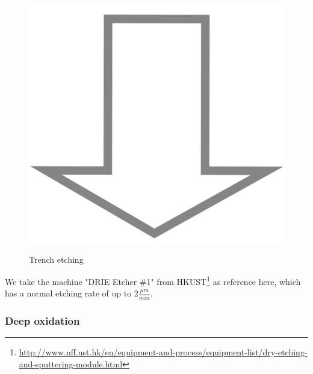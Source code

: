 \begin{figure}[H]
	\centering
	\begin{tikzpicture}[node distance = 3cm, auto, thick,scale=\CrossSectionOnly, every node/.style={transform shape}]
		
	\end{tikzpicture} \\
	\includegraphics[scale=0.01]{down_arrow.png} \\
	\begin{tikzpicture}[node distance = 3cm, auto, thick,scale=\CrossSectionOnly, every node/.style={transform shape}]
		
	\end{tikzpicture}
	\caption{Trench etching}
\end{figure}

We take the machine "DRIE Etcher \#1" from HKUST\footnote{\url{http://www.nff.ust.hk/en/equipment-and-process/equipment-list/dry-etching-and-sputtering-module.html}} as reference here, which has a normal etching rate of up to $2\frac{\mu m}{min}$.

\subsubsection{Deep oxidation}

